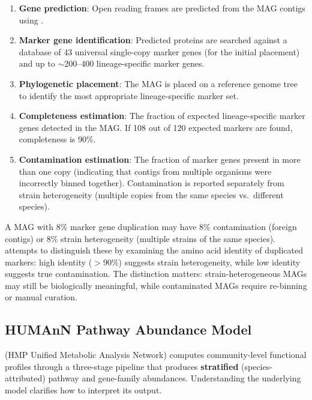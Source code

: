 \begin{enumerate}[nosep]
  \item \textbf{Gene prediction}: Open reading frames are predicted from the MAG contigs using .
  \item \textbf{Marker gene identification}: Predicted proteins are searched against a database of 43 universal single-copy marker genes (for the initial placement) and up to $\sim$200--400 lineage-specific marker genes.
  \item \textbf{Phylogenetic placement}: The MAG is placed on a reference genome tree to identify the most appropriate lineage-specific marker set.
  \item \textbf{Completeness estimation}: The fraction of expected lineage-specific marker genes detected in the MAG. If 108 out of 120 expected markers are found, completeness is 90\%.
  \item \textbf{Contamination estimation}: The fraction of marker genes present in more than one copy (indicating that contigs from multiple organisms were incorrectly binned together). Contamination is reported separately from strain heterogeneity (multiple copies from the same species vs.\ different species).
\end{enumerate}

\begin{warningbox}[title={Contamination vs.\ Strain Heterogeneity}]
A MAG with 8\% marker gene duplication may have 8\% contamination (foreign contigs) or 8\% strain heterogeneity (multiple strains of the same species).  attempts to distinguish these by examining the amino acid identity of duplicated markers: high identity ($>$90\%) suggests strain heterogeneity, while low identity suggests true contamination. The distinction matters: strain-heterogeneous MAGs may still be biologically meaningful, while contaminated MAGs require re-binning or manual curation.
\end{warningbox}

\subsection{HUMAnN Pathway Abundance Model}
\label{subsec:metagenomics:humann_model}

 (HMP Unified Metabolic Analysis Network) computes community-level functional profiles through a three-stage pipeline that produces \textbf{stratified} (species-attributed) pathway and gene-family abundances. Understanding the underlying model clarifies how to interpret its output.

